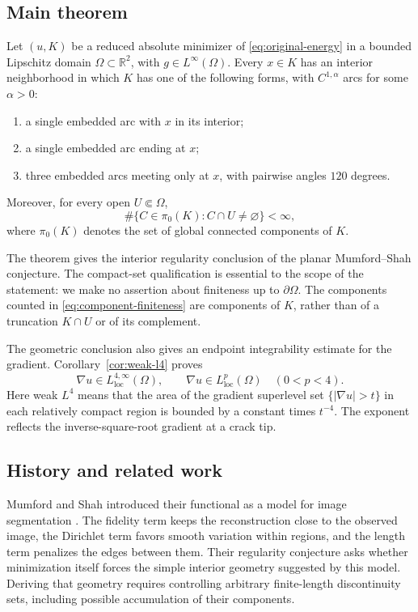 \subsection{Main theorem}
\begin{theorem}\label{thm:main}
Let $(u,K)$ be a reduced absolute minimizer of
\eqref{eq:original-energy} in a bounded Lipschitz domain
$\Omega\subset\mathbb R^2$, with $g\in L^\infty(\Omega)$.
Every $x\in K$ has an interior neighborhood in which $K$ has one of the
following forms, with $C^{1,\alpha}$ arcs for some $\alpha>0$:
\begin{enumerate}[label=\textup{(\roman*)},nosep]
 \item a single embedded arc with $x$ in its interior;
 \item a single embedded arc ending at $x$;
 \item three embedded arcs meeting only at $x$, with pairwise angles
       $120$ degrees.
\end{enumerate}
Moreover, for every open $U\Subset\Omega$,
\begin{equation}\label{eq:component-finiteness}
 \#\{C\in\pi_0(K):C\cap U\ne\varnothing\}<\infty,
\end{equation}
where $\pi_0(K)$ denotes the set of global connected components of $K$.
\end{theorem}

The theorem gives the interior regularity conclusion of the planar
Mumford--Shah conjecture.  The compact-set qualification is essential to
the scope of the statement: we make no assertion about finiteness up to
$\partial\Omega$.  The components counted in
\eqref{eq:component-finiteness} are components of $K$, rather than of a
truncation $K\cap U$ or of its complement.

The geometric conclusion also gives an endpoint integrability estimate for
the gradient.  Corollary~\ref{cor:weak-l4} proves
\[
 \nabla u\in L^{4,\infty}_{\mathrm{loc}}(\Omega),
 \qquad \nabla u\in L^p_{\mathrm{loc}}(\Omega)\quad(0<p<4).
\]
Here weak $L^4$ means that the area of the gradient superlevel set
$\{|\nabla u|>t\}$ in each relatively compact region is bounded by a
constant times $t^{-4}$.  The exponent reflects the inverse-square-root
gradient at a crack tip.

\subsection{History and related work}
Mumford and Shah introduced their functional as a model for image
segmentation \cite{mumford_shah1989}. The fidelity term keeps the
reconstruction close to the observed image, the Dirichlet term favors
smooth variation within regions, and the length term penalizes the edges
between them. Their regularity conjecture asks whether minimization itself
forces the simple interior geometry suggested by this model. Deriving that
geometry requires controlling arbitrary finite-length discontinuity sets,
including possible accumulation of their components.

